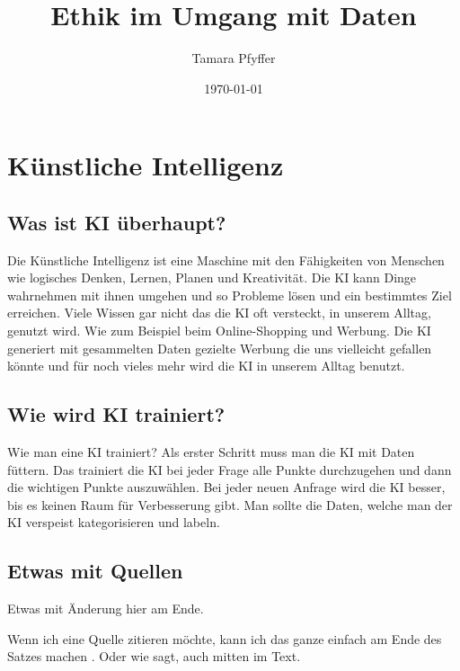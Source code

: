 \documentclass{report}
\title{Ethik im Umgang mit Daten}
\author{Tamara Pfyffer}
\date{\today}
\begin{document}
\maketitle


\tableofcontents

\chapter{Künstliche Intelligenz}

\section{Was ist KI überhaupt?}
Die Künstliche Intelligenz ist eine Maschine mit den Fähigkeiten von Menschen wie logisches Denken, Lernen, Planen und Kreativität. Die KI kann
Dinge wahrnehmen mit ihnen umgehen und so Probleme lösen und ein bestimmtes Ziel erreichen. Viele Wissen gar nicht das die KI oft versteckt,
in unserem Alltag, genutzt wird. Wie zum Beispiel beim Online-Shopping
und Werbung. Die KI generiert mit gesammelten Daten gezielte Werbung
die uns vielleicht gefallen könnte und für noch vieles mehr wird die KI in
unserem Alltag benutzt.

\section{Wie wird KI trainiert?}
Wie man eine KI trainiert? Als erster Schritt muss man die KI mit Daten
füttern. Das trainiert die KI bei jeder Frage alle Punkte durchzugehen und
dann die wichtigen Punkte auszuwählen. Bei jeder neuen Anfrage wird die
KI besser, bis es keinen Raum für Verbesserung gibt. Man sollte die Daten,
welche man der KI verspeist kategorisieren und labeln.





\section{Etwas mit Quellen}

Etwas mit Änderung hier am Ende.

Wenn ich eine Quelle zitieren möchte, kann ich das ganze einfach am Ende des Satzes machen \citep{example}. Oder wie \citet{example} sagt, auch mitten im Text.

\printbibliography
\end{document}
